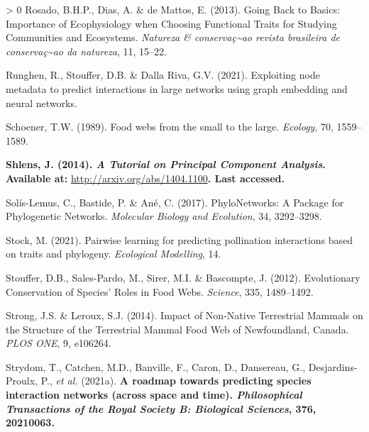 \documentclass[11pt]{article}
\makeatletter
\def\maxwidth{\ifdim\Gin@nat@width>\linewidth\linewidth
\else\Gin@nat@width\fi}
\let\Oldincludegraphics\includegraphics
\renewcommand{\includegraphics}[1]{\Oldincludegraphics[width=\maxwidth]{#1}}
\newlength{\cslhangindent}
\newenvironment{CSLReferences}[3] %
 {%
  \setlength{\parindent}{0pt}
  \ifodd #1 \everypar{\setlength{\hangindent}{\cslhangindent}}\ignorespaces\fi
  \ifnum #2 > 0
  \setlength{\parskip}{#2\baselineskip}
  \fi
 }%
 {}
\providecommand{\DIFaddtex}[1]{{\bf #1}} %
\providecommand{\DIFdeltex}[1]{} %
\providecommand{\DIFaddbegin}{\protect\color{blue}} %
\providecommand{\DIFaddend}{\protect\color{black}} %
\providecommand{\DIFdelbegin}{\protect\color{red}} %
\providecommand{\DIFdelend}{\protect\color{black}} %
\providecommand{\DIFadd}[1]{\texorpdfstring{\DIFaddtex{#1}}{#1}} %
\providecommand{\DIFdel}[1]{\texorpdfstring{\DIFdeltex{#1}}{}} %
\newcommand{\DIFscaledelfig}{0.5}
\newlength{\DIFdelgraphicswidth} %
\newlength{\DIFdelgraphicsheight} %
\newcommand{\DIFaddincludegraphics}[2][]{{\color{blue}\fbox{\DIFOincludegraphics[#1]{#2}}}} %
\newcommand{\DIFdelincludegraphics}[2][]{%
\sbox{\DIFdelgraphicsbox}{\DIFOincludegraphics[#1]{#2}}%
\settoboxwidth{\DIFdelgraphicswidth}{\DIFdelgraphicsbox} %
\settoboxtotalheight{\DIFdelgraphicsheight}{\DIFdelgraphicsbox} %
\scalebox{\DIFscaledelfig}{%
\parbox[b]{\DIFdelgraphicswidth}{\usebox{\DIFdelgraphicsbox}\\[-\baselineskip] \rule{\DIFdelgraphicswidth}{0em}}\llap{\resizebox{\DIFdelgraphicswidth}{\DIFdelgraphicsheight}{%
\setlength{\unitlength}{\DIFdelgraphicswidth}%
\begin{picture}(1,1)%
\thicklines\linethickness{2pt} %
{\color[rgb]{1,0,0}\put(0,0){\framebox(1,1){}}}%
{\color[rgb]{1,0,0}\put(0,0){\line( 1,1){1}}}%
{\color[rgb]{1,0,0}\put(0,1){\line(1,-1){1}}}%
\end{picture}%
}\hspace*{3pt}}} %
} %
\DeclareRobustCommand{\DIFaddbegin}{\DIFOaddbegin \let\includegraphics\DIFaddincludegraphics} %
\DeclareRobustCommand{\DIFaddend}{\DIFOaddend \let\includegraphics\DIFOincludegraphics} %
\DeclareRobustCommand{\DIFdelbegin}{\DIFOdelbegin \let\includegraphics\DIFdelincludegraphics} %
\DeclareRobustCommand{\DIFdelend}{\DIFOaddend \let\includegraphics\DIFOincludegraphics} %
\makeatother
\begin{document}
\begin{CSLReferences}{1}{0}
\leavevmode\hypertarget{ref-Rosado2013GoiBac}{}%
Rosado, B.H.P., Dias, A. \& de Mattos, E. (2013). Going Back to Basics:
Importance of Ecophysiology when Choosing Functional Traits for Studying
Communities and Ecosystems. \emph{Natureza \&
conservaç\textasciitilde ao revista brasileira de
conservaç\textasciitilde ao da natureza}, 11, 15--22.

\leavevmode\hypertarget{ref-Runghen2021ExpNod}{}%
Runghen, R., Stouffer, D.B. \& Dalla Riva, G.V. (2021). Exploiting node
metadata to predict interactions in large networks using graph embedding
and neural networks.

\leavevmode\hypertarget{ref-Schoener1989FooWeb}{}%
Schoener, T.W. (1989). Food webs from the small to the large.
\emph{Ecology}, 70, 1559--1589.

\leavevmode\DIFaddbegin \hypertarget{ref-Shlens2014TutPri}{}%
\DIFadd{Shlens, J. (2014). \emph{A Tutorial on Principal Component Analysis}.
Available at: }\url{http://arxiv.org/abs/1404.1100}\DIFadd{. Last accessed.
}

\leavevmode\DIFaddend \hypertarget{ref-Solis-Lemus2017PhyPac}{}%
Solís-Lemus, C., Bastide, P. \& Ané, C. (2017). PhyloNetworks: A Package
for Phylogenetic Networks. \emph{Molecular Biology and Evolution}, 34,
3292--3298.

\leavevmode\hypertarget{ref-Stock2021PaiLea}{}%
Stock, M. (2021). Pairwise learning for predicting pollination
interactions based on traits and phylogeny. \emph{Ecological Modelling},
14.

\leavevmode\hypertarget{ref-Stouffer2012EvoCon}{}%
Stouffer, D.B., Sales-Pardo, M., Sirer, M.I. \& Bascompte, J. (2012).
Evolutionary Conservation of Species' Roles in Food Webs.
\emph{Science}, 335, 1489--1492.

\leavevmode\hypertarget{ref-Strong2014ImpNon}{}%
Strong, J.S. \& Leroux, S.J. (2014). Impact of Non-Native Terrestrial
Mammals on the Structure of the Terrestrial Mammal Food Web of
Newfoundland, Canada. \emph{PLOS ONE}, 9, e106264.

\leavevmode\hypertarget{ref-Strydom2021RoaPre}{}%
Strydom, T., Catchen, M.D., Banville, F., Caron, D., Dansereau, G.,
Desjardins-Proulx, P., \emph{et al.} (2021a). \DIFdelbegin \DIFdel{\emph{A Roadmap Toward
Predicting Species Interaction Networks (Across Space and Time)}
(Preprint).
EcoEvoRxiv.
}\DIFdelend \DIFaddbegin \DIFadd{A roadmap towards
predicting species interaction networks (across space and time).
\emph{Philosophical Transactions of the Royal Society B: Biological
Sciences}, 376, 20210063.
}\DIFaddend 


\end{CSLReferences}
\end{document}
